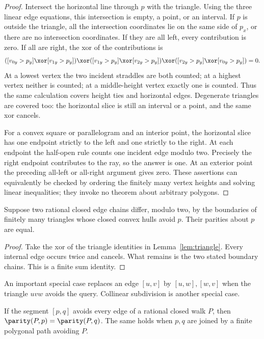 \begin{proof}
Intersect the horizontal line through $p$ with the triangle.
Using the three linear edge equations, this intersection is empty,
a point, or an interval. If $p$ is outside the triangle, all the
intersection coordinates lie on the same side of $p_x$, or there
are no intersection coordinates. If they are all left, every
contribution is zero. If all are right, the xor of the contributions is
\[
 ([v_{0y}>p_y]\xor[v_{1y}>p_y])
 \xor([v_{1y}>p_y]\xor[v_{2y}>p_y])
 \xor([v_{2y}>p_y]\xor[v_{0y}>p_y])=0.
\]
At a lowest vertex the two incident straddles are both counted; at a
highest vertex neither is counted; at a middle-height vertex exactly
one is counted. Thus the same calculation covers height ties and
horizontal edges. Degenerate triangles are covered too: the horizontal
slice is still an interval or a point, and the same xor cancels.

For a convex square or parallelogram and an interior point, the
horizontal slice has one endpoint strictly to the left and one strictly
to the right. At each endpoint the half-open rule counts one incident
edge modulo two. Precisely the right endpoint contributes to the ray,
so the answer is one. At an exterior point the preceding all-left or
all-right argument gives zero. These assertions can equivalently be
checked by ordering the finitely many vertex heights and solving
linear inequalities; they invoke no theorem about arbitrary polygons.
\end{proof}

\begin{lemma}\label{lem:replacement}
Suppose two rational closed edge chains differ, modulo two, by the
boundaries of finitely many triangles whose closed convex hulls avoid
$p$. Their parities about $p$ are equal.
\end{lemma}

\begin{proof}
Take the xor of the triangle identities in Lemma~\ref{lem:triangle}.
Every internal edge occurs twice and cancels. What remains is the
two stated boundary chains. This is a finite sum identity.
\end{proof}

An important special case replaces an edge $[u,v]$ by $[u,w],[w,v]$
when the triangle $uvw$ avoids the query. Collinear subdivision is
another special case.

\begin{lemma}\label{lem:moving}
If the segment $[p,q]$ avoids every edge of a rational closed walk $P$,
then $\parity(P,p)=\parity(P,q)$. The same holds when $p,q$ are joined
by a finite polygonal path avoiding $P$.
\end{lemma}

